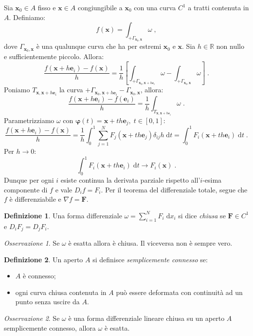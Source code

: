 \documentclass[a4paper,12pt]{report}
\theoremstyle{plain}
\theoremstyle{definition}
\newtheorem{defn}{Definizione}[section]
\theoremstyle{remark}
\newtheorem{oss}{Osservazione}[section]
\newcommand{\diff}[1]{\mathrm{d}#1}
\numberwithin{equation}{section}
\begin{document}
Sia $\mathbf{x}_0\in A$ fisso e $\mathbf{x}\in A$ congiungibile a $\mathbf{x}_0$ con una curva $C^1$ a tratti contenuta in $A$. Definiamo:
\begin{equation}
f(\mathbf{x})=\int_{+\Gamma_{\mathbf{x}_0,\mathbf{x}}} \omega\;,
\end{equation}
dove $\Gamma_{\mathbf{x}_0,\mathbf{x}}$ è una qualunque curva che ha per estremi $\mathbf{x}_0$ e $\mathbf{x}$. Sia $h\in\mathbb{R}$ non nullo e sufficientemente piccolo. Allora:
\begin{equation}
\frac{f(\mathbf{x}+h\mathbf{e}_i)-f(\mathbf{x})}{h}=\frac{1}{h}\left[\int_{+\Gamma_{\mathbf{x}_0,\mathbf{x}+h\mathbf{e}_i}} \omega -
\int_{+\Gamma_{\mathbf{x}_0,\mathbf{x}}} \omega\right]\;.
\end{equation}
Poniamo $T_{\mathbf{x},\mathbf{x}+h\mathbf{e}_i}$ la curva $+\Gamma_{\mathbf{x}_0,\mathbf{x}+h\mathbf{e}_i}-\Gamma_{\mathbf{x}_0,\mathbf{x}}$, allora:
\begin{equation}
\frac{f(\mathbf{x}+h\mathbf{e}_i)-f(\mathbf{e}_i)}{h}=\frac{1}{h}\int_{T_{\mathbf{x},\mathbf{x}+h\mathbf{e}_i}}\omega\;.
\end{equation}
Parametrizziamo $\omega$ con $\boldsymbol{\varphi}(t)=\mathbf{x}+th\mathbf{e}_j,\;t\in[0,1]$:
\begin{equation}
\frac{f(\mathbf{x}+h\mathbf{e}_i)-f(\mathbf{x})}{h}=\frac{1}{h}\int_0^1\sum_{j=1}^N F_j(\mathbf{x}+th\mathbf{e}_j)\delta_{ij}h\;\diff{t}=\int_0^1 F_i(\mathbf{x}+th\mathbf{e}_i)\;\diff{t}\;.
\end{equation}
Per $h\to 0$:
\begin{equation}
\int_0^1 F_i(\mathbf{x}+th\mathbf{e}_i)\;\diff{t} \to F_i(\mathbf{x})\;.
\end{equation}
Dunque per ogni $i$ esiste continua la derivata parziale rispetto all'$i$-esima componente di $f$ e vale $D_if=F_i$. Per il teorema del 
differenziale totale, segue che $f$ è differenziabile e $\nabla f=\mathbf{F}$.
\endproof
\begin{defn} Una forma differenziale $\omega=\sum_{i=1}^N F_i\;\diff{x}_i$ si dice \textit{chiusa} se $\mathbf{F}\in C^1$ e $D_iF_j=D_jF_i$.
\end{defn}
\begin{oss} Se $\omega$ è esatta allora è chiusa. Il viceversa non è sempre vero.
\end{oss}
\begin{defn} Un aperto $A$ si definisce \textit{semplicemente connesso} se:
\begin{itemize}
 \item $A$ è connesso;
 \item ogni curva chiusa contenuta in $A$ può essere deformata con continuità ad un punto senza uscire da $A$.
\end{itemize}
\end{defn}
\begin{oss} Se $\omega$ è una forma differenziale lineare chiusa su un aperto $A$ semplicemente connesso, allora $\omega$ è esatta.
\end{oss}
\end{document}
